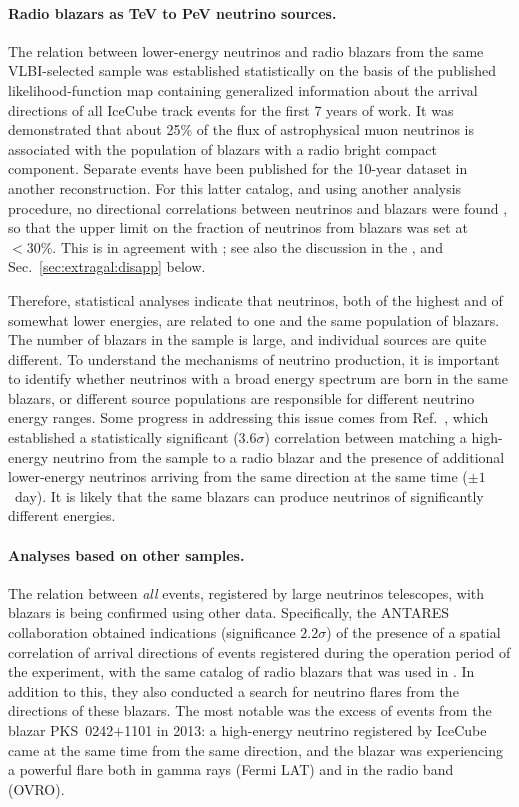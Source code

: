 \documentclass[a4paper,noshowpacs,noshowkeys,floatfix,twocolumn,preprintnumbers,nofootinbib]{revtex4-2}
\begin{document}
\paragraph{Radio blazars as TeV to PeV neutrino sources.}
The relation between lower-energy neutrinos and radio blazars from the same VLBI-selected sample was established statistically \cite{neutradio2} on the basis of the published likelihood-function map containing generalized information about the arrival directions of all IceCube track events for the first 7 years of work. It was demonstrated that about 25\% of the flux of astrophysical muon neutrinos is associated with the population of blazars with a radio bright compact component. Separate events have been published for the 10-year dataset in another reconstruction. For this latter catalog, and using another analysis procedure, no directional correlations between neutrinos and blazars were found \cite{Zhou}, so that the upper limit on the fraction of neutrinos from blazars was set at $<30\%$. This is in agreement with \cite{neutradio2}; see also the discussion in the \cite{PlavinICRC2021}, and Sec.~\ref{sec:extragal:disapp} below.

Therefore, statistical analyses indicate that neutrinos, both of the highest and of somewhat lower energies, are related to one and the same population of blazars. The number of blazars in the sample is large, and individual sources are quite different. To understand the mechanisms of neutrino production, it is important to identify whether neutrinos with a broad energy spectrum are born in the same blazars, or different source populations are responsible for different neutrino energy ranges. Some progress in addressing this issue comes from Ref.~\cite{flares}, which established a statistically significant ($3.6\sigma$) correlation between matching a high-energy neutrino from the sample \cite{neutradio2022} to a radio blazar and the presence of additional lower-energy neutrinos arriving from the same direction at the same time ($\pm 1$~day). It is likely that the same blazars can produce neutrinos of significantly different energies.

\paragraph{Analyses based on other samples.}
The relation between \textit{all} events, registered by large neutrinos telescopes, with blazars is being confirmed using other data. Specifically, the ANTARES collaboration obtained \cite{ANTARES-blazars} indications (significance $2.2\sigma$) of the presence of a spatial correlation of arrival directions of events registered during the operation period of the experiment, with the same catalog of radio blazars that was used in \cite{neutradio1, neutradio2, neutradio2022}. In addition to this, they also conducted a search for neutrino flares from the directions of these blazars. The most notable was the excess of events from the blazar PKS~0242$+$1101 in 2013: a high-energy neutrino registered by IceCube came at the same time from the same direction, and the blazar was experiencing a powerful flare both in gamma rays (Fermi LAT) and in the radio band (OVRO).
\end{document}
